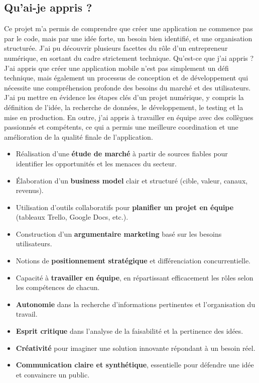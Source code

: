 \documentclass{mytex}
\begin{document}



\subsection{Qu'ai-je appris ?}

Ce projet m’a permis de comprendre que créer une application ne commence pas par le code, mais par une idée forte, un besoin bien identifié, et une organisation structurée. J’ai pu découvrir plusieurs facettes du rôle d’un entrepreneur numérique, en sortant du cadre strictement technique. Qu'est-ce que j'ai appris ? J'ai appris que créer une application mobile n'est pas simplement un défi technique, mais également un processus de conception et de développement qui nécessite une compréhension profonde des besoins du marché et des utilisateurs. J'ai pu mettre en évidence les étapes clés d'un projet numérique, y compris la définition de l'idée, la recherche de données, le développement, le testing et la mise en production. En outre, j'ai appris à travailler en équipe avec des collègues passionnés et compétents, ce qui a permis une meilleure coordination et une amélioration de la qualité finale de l'application.


\begin{itemize}
	\item Réalisation d’une \textbf{étude de marché} à partir de sources fiables pour identifier les opportunités et les menaces du secteur.
	\item Élaboration d’un \textbf{business model} clair et structuré (cible, valeur, canaux, revenus).
	\item Utilisation d’outils collaboratifs pour \textbf{planifier un projet en équipe} (tableaux Trello, Google Docs, etc.).
	\item Construction d’un \textbf{argumentaire marketing} basé sur les besoins utilisateurs.
	\item Notions de \textbf{positionnement stratégique} et différenciation concurrentielle.
\end{itemize}


\begin{itemize}
	\item Capacité à \textbf{travailler en équipe}, en répartissant efficacement les rôles selon les compétences de chacun.
	\item \textbf{Autonomie} dans la recherche d’informations pertinentes et l’organisation du travail.
	\item \textbf{Esprit critique} dans l’analyse de la faisabilité et la pertinence des idées.
	\item \textbf{Créativité} pour imaginer une solution innovante répondant à un besoin réel.
	\item \textbf{Communication claire et synthétique}, essentielle pour défendre une idée et convaincre un public.
\end{itemize}
\end{document}
